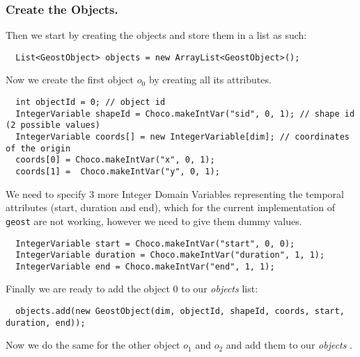 \subsubsection{Create the Objects.}\label{geostdescription:createtheobjects}\hypertarget{geostdescription:createtheobjects}{}
Then we start by creating the objects and store them in a list as such:
\begin{lstlisting}
  List<GeostObject> objects = new ArrayList<GeostObject>();
\end{lstlisting}
Now we create the first object $o_0$ by creating all its attributes.
\begin{lstlisting}
  int objectId = 0; // object id
  IntegerVariable shapeId = Choco.makeIntVar("sid", 0, 1); // shape id (2 possible values)
  IntegerVariable coords[] = new IntegerVariable[dim]; // coordinates of the origin 
  coords[0] = Choco.makeIntVar("x", 0, 1);  
  coords[1] =  Choco.makeIntVar("y", 0, 1);
\end{lstlisting}
We need to specify 3 more Integer Domain Variables representing the temporal attributes (start, duration and end), which for the current implementation of \texttt{geost} are not working, however we need to give them dummy values. 
\begin{lstlisting}
  IntegerVariable start = Choco.makeIntVar("start", 0, 0);
  IntegerVariable duration = Choco.makeIntVar("duration", 1, 1);
  IntegerVariable end = Choco.makeIntVar("end", 1, 1);
\end{lstlisting}
Finally we are ready to add the object 0 to our \emph{objects} list:
\begin{lstlisting}
  objects.add(new GeostObject(dim, objectId, shapeId, coords, start, duration, end));
\end{lstlisting}
Now we do the same for the other  object $o_1$  and  $o_2$ and add them to our \emph{objects} .


